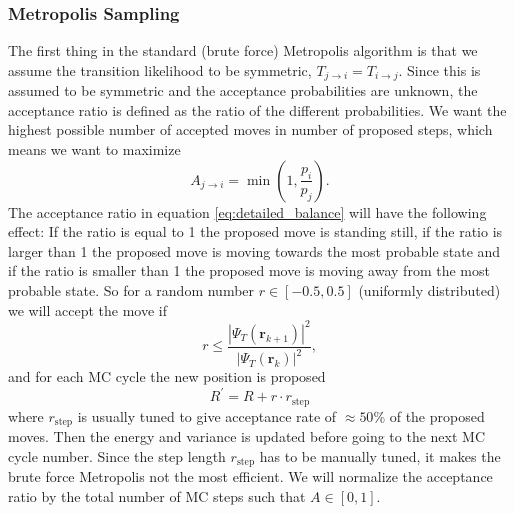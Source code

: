 \documentclass[12pt,a4paper,english]{article}
\begin{document}
\subsubsection{Metropolis Sampling}
\label{subsubsect:brute_Metropolis}
The first thing in the standard (brute force) Metropolis algorithm is that we assume the transition likelihood to be symmetric, $T_{j\rightarrow i}=T_{i\rightarrow j}$. Since this is assumed to be symmetric and the acceptance probabilities are unknown, the acceptance ratio is defined as the ratio of the different probabilities. We want the highest possible number of accepted moves in number of proposed steps, which means we want to maximize 
\[A_{j\rightarrow i}=\min(1, \frac{p_i}{p_j}).\] 
The acceptance ratio in equation \ref{eq:detailed_balance} will have the following effect: If the ratio is equal to 1 the proposed move is standing still, if the ratio is larger than 1 the proposed move is moving towards the most probable state and if the ratio is smaller than 1 the proposed move is moving away from the most probable state. So for a random number $r\in[-0.5,0.5]$ (uniformly distributed) we will accept the move if
\begin{equation}
\label{eq:brute_accept_move}
r\leq\frac{|\Psi_T(\textbf{r}_{k+1})|^2}{|\Psi_T(\textbf{r}_k)|^2},
\end{equation}
and for each MC cycle the new position is proposed \[R^{\prime}=R+r\cdot r_{\text{step}}\]
where $r_{\text{step}}$ is usually tuned to give acceptance rate of $\approx50$\% of the proposed moves. Then the energy and variance is updated before going to the next MC cycle number. Since the step length $r_{\text{step}}$ has to be manually tuned, it makes the brute force Metropolis not the most efficient. We will normalize the acceptance ratio by the total number of MC steps such that $A\in[0,1]$.
\end{document}
